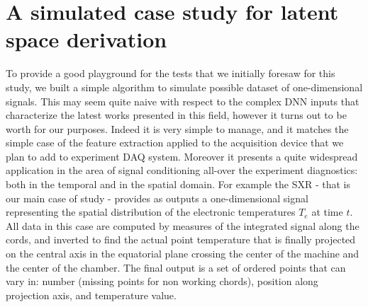 \section{A simulated case study for latent space derivation}

To provide a good playground for the tests that we initially foresaw for this study, we built a simple algorithm to simulate possible dataset of one-dimensional signals. This may seem quite naive with respect to the complex \acs{DNN} inputs that characterize the latest works presented in this field, however it turns out to be worth for our purposes. Indeed it is very simple to manage, and it matches the simple case of the feature extraction applied to the acquisition device that we plan to add to experiment \acs{DAQ} system. Moreover it presents a quite widespread application in the area of signal conditioning all-over the experiment diagnostics: both in the temporal and in the spatial domain. For example the \acs{SXR} - that is our main case of study - provides as outputs a one-dimensional signal representing the spatial distribution of the electronic temperatures $T_e$ at time $t$. All data in this case are computed by measures of the integrated signal along the cords, and inverted to find the actual point temperature that is finally projected on the central axis in the equatorial plane crossing the center of the machine and the center of the chamber. The final output is a set of ordered points that can vary in: number (missing points for non working chords), position along projection axis, and temperature value.

